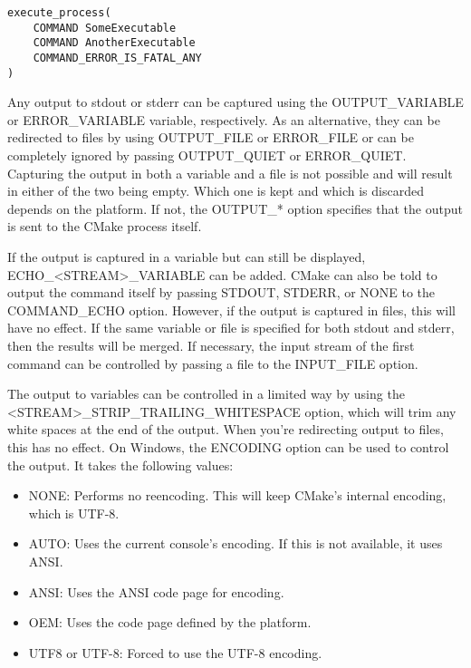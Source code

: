 \begin{lstlisting}[style=styleCMake]
execute_process(
	COMMAND SomeExecutable
	COMMAND AnotherExecutable
	COMMAND_ERROR_IS_FATAL_ANY
)
\end{lstlisting}

Any output to stdout or stderr can be captured using the OUTPUT\_VARIABLE or ERROR\_VARIABLE variable, respectively. As an alternative, they can be redirected to files by using OUTPUT\_FILE or ERROR\_FILE or can be completely ignored by passing OUTPUT\_QUIET or ERROR\_QUIET. Capturing the output in both a variable and a file is not possible and will result in either of the two being empty. Which one is kept and which is discarded depends on the platform. If not, the OUTPUT\_* option specifies that the output is sent to the CMake process itself.

If the output is captured in a variable but can still be displayed, ECHO\_<STREAM>\_VARIABLE can be added. CMake can also be told to output the command itself by passing STDOUT, STDERR, or NONE to the COMMAND\_ECHO option. However, if the output is captured in files, this will have no effect. If the same variable or file is specified for both stdout and stderr, then the results will be merged. If necessary, the input stream of the first command can be controlled by passing a file to the INPUT\_FILE option.

The output to variables can be controlled in a limited way by using the <STREAM>\_STRIP\_TRAILING\_WHITESPACE option, which will trim any white spaces at the end of the output. When you're redirecting output to files, this has no effect. On Windows, the ENCODING option can be used to control the output. It takes the following values:

\begin{itemize}
\item 
NONE: Performs no reencoding. This will keep CMake's internal encoding, which is UTF-8.

\item 
AUTO: Uses the current console's encoding. If this is not available, it uses ANSI.

\item 
ANSI: Uses the ANSI code page for encoding.

\item 
OEM: Uses the code page defined by the platform.

\item 
UTF8 or UTF-8: Forced to use the UTF-8 encoding.
\end{itemize}

